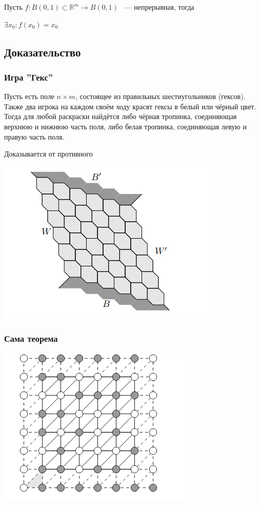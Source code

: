 \documentclass{article}
\begin{document}
            Пусть $f: B(0, 1) \subset \mathbb{R}^m \rightarrow B(0, 1)$ ~--- непрерывная, тогда
		
            $\exists x_0 : f(x_0) = x_0$
		
		\subsection{Доказательство}
		
		\subsubsection{Игра ''Гекс''}
		
			Пусть есть поле $n \times m$, состоящее из правильных шестиугольников (гексов). Также два игрока на каждом своём ходу красят гексы в белый или чёрный цвет. Тогда для любой раскраски найдётся либо чёрная тропинка, соединяющая верхнюю и нижнюю часть поля, либо белая тропинка, соединяющая левую и правую часть поля.
			
			Доказывается от противного
		
			\includegraphics[scale=0.5]{HEX.png}
				
		\subsubsection{Сама теорема}
		
			\includegraphics[scale=0.45]{NEWHEX.png}
		
\end{document}
